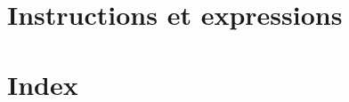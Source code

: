 \documentclass[a4paper, 11pt, openany]{book}
\begin{document}
\part{Instructions et expressions}








\part{Index}

{\small
\printindex
}

\end{document}
